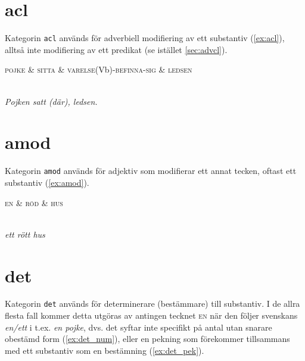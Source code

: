 \documentclass[11pt,a4paper]{article}
\begin{document}
\section{acl}
Kategorin \texttt{acl} används för adverbiell modifiering av ett substantiv (\ref{ex:acl}), alltså inte modifiering av ett predikat (se istället \ref{sec:advcl}).

\begin{example}
\label{ex:acl}
\begin{dependency}[theme = simple]
   \begin{deptext}[column sep=1em]
      \textsc{pojke} \& \textsc{sitta} \& \textsc{varelse}(Vb)-\textsc{befinna-sig} \& \textsc{ledsen} \\
   \end{deptext}
\end{dependency}
\\
\textit{Pojken satt (där), ledsen.}
\end{example}


\section{amod}
Kategorin \texttt{amod} används för adjektiv som modifierar ett annat tecken, oftast ett substantiv (\ref{ex:amod}).

\begin{example}
\label{ex:amod}
\begin{dependency}[theme = simple]
   \begin{deptext}[column sep=1em]
      \textsc{en} \& \textsc{röd} \& \textsc{hus} \\
   \end{deptext}
\end{dependency}
\\
\textit{ett rött hus}
\end{example}

\section{det}
Kategorin \texttt{det} används för determinerare (bestämmare) till substantiv. I de allra flesta fall kommer detta utgöras av antingen tecknet \textsc{en} när den följer svenskans \textit{en/ett} i t.ex. \textit{en pojke}, dvs. det syftar inte specifikt på antal utan snarare obestämd form (\ref{ex:det_num}), eller en pekning som förekommer tillsammans med ett substantiv som en bestämning (\ref{ex:det_pek}).
\end{document}
